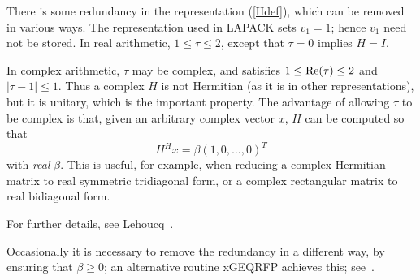 There is some redundancy in the representation (\ref{Hdef}), which can be 
removed in
various ways. The representation used in LAPACK sets $v_1 = 1$; hence $v_1$ need not
be stored. In real arithmetic, $1 \leq \tau \leq 2$, except that
$\tau = 0$ implies $H = I$.

In complex arithmetic, $\tau$ may be 
complex, and satisfies
$1 \leq \rm{Re}(\tau) \leq 2$ and $| \tau - 1 | \leq 1$.
Thus a complex $H$ is
not Hermitian (as it is in other representations), but it is unitary,
which is the important property. The advantage of allowing $\tau$ to be
complex is that, given an arbitrary complex vector $x$, $H$ can be computed
so that \[ H^H x = \beta (1, 0, \ldots , 0)^T \]
with {\it real} $\beta$. This is useful, for example,
when reducing a complex Hermitian matrix to real symmetric tridiagonal form,
or a complex rectangular matrix to real bidiagonal form.

For further details, see Lehoucq~\cite{lawn72}.

Occasionally it is necessary to remove the redundancy in a different way, by ensuring that
$\beta \geq 0$; an alternative routine 
xGEQRFP achieves this; see~\cite{lawn203}.
